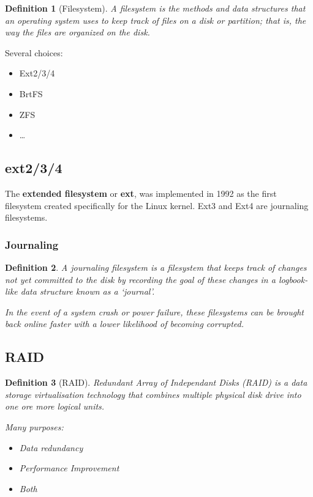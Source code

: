 \documentclass{article}
\newtheorem{theorem}{Definition}[section]
\begin{document}
\begin{theorem}[Filesystem]
    A filesystem is the methods and data structures that an operating system uses to keep track of files on a disk or partition; that is, the way the files are organized on the disk.
\end{theorem}

Several choices:

\begin{itemize}
    \item Ext2/3/4
    \item BrtFS
    \item ZFS
    \item \dots
\end{itemize}

\subsection{ext2/3/4}

The \textbf{extended filesystem} or \textbf{ext}, was implemented in 1992 as
the first filesystem created specifically for the Linux kernel. 
Ext3 and Ext4 are journaling filesystems.

\subsubsection{Journaling}

\begin{theorem}
    A journaling filesystem is a filesystem that keeps track of changes
    not yet committed to the disk by recording the goal of these changes
    in a logbook-like data structure known as a `journal'. 

    In the event of a system crash or power failure, these filesystems can be
    brought back online faster with a lower likelihood of becoming corrupted.
\end{theorem}

\subsection{RAID}

\begin{theorem}[RAID]
    Redundant Array of Independant Disks (RAID) is a data storage virtualisation technology that combines multiple physical disk drive into one ore more logical units.

    Many purposes:

    \begin{itemize}
        \item Data redundancy
        \item Performance Improvement
        \item Both
    \end{itemize}
\end{theorem}
\end{document}
